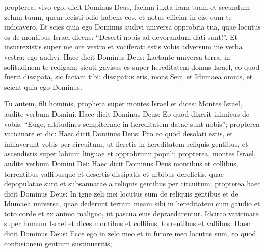 \begin{biblechapter}
\begin{biblechapter}
\begin{biblechapter}
\begin{biblechapter}
\begin{biblechapter}
\begin{biblechapter}
\begin{biblechapter}
\begin{biblechapter}
\begin{biblechapter}
\begin{biblechapter}
\begin{biblechapter}
\begin{biblechapter}
\begin{biblechapter}
\begin{biblechapter}
\begin{biblechapter}
\begin{biblechapter}
\begin{biblechapter}
\begin{biblechapter}
\begin{biblechapter}
\begin{biblechapter}
\begin{biblechapter}
\begin{biblechapter}
\begin{biblechapter}
\begin{biblechapter}
\begin{biblechapter}
\begin{biblechapter}
\begin{biblechapter}
\begin{biblechapter}
\begin{biblechapter}
\begin{biblechapter}
\begin{biblechapter}
\begin{biblechapter}
\begin{biblechapter}
\begin{biblechapter}
\begin{biblechapter}
\verse propterea, vivo ego, dicit Dominus Deus, faciam iuxta iram tuam et secundum zelum tuum, quem fecisti odio habens eos, et notus efficiar in eis, cum te iudicavero. 
\verse Et scies quia ego Dominus audivi universa opprobria tua, quae locutus es de montibus Israel dicens: “Deserti nobis ad devorandum dati sunt!”. 
\verse Et insurrexistis super me ore vestro et vociferati estis vobis adversum me verba vestra; ego audivi.
 \verse Haec dicit Dominus Deus: Laetante universa terra, in solitudinem te redigam; 
\verse sicuti gavisus es super hereditatem domus Israel, eo quod fuerit dissipata, sic faciam tibi: dissipatus eris, mons Seir, et Idumaea omnis, et scient quia ego Dominus.
 
\begin{biblechapter}
\verse Tu autem, fili hominis, propheta super montes Israel et dices: Montes Israel, audite verbum Domini. 
 \verse Haec dicit Dominus Deus: Eo quod dixerit inimicus de vobis: “Euge, altitudines sempiternae in hereditatem datae sunt nobis”; 
 \verse propterea vaticinare et dic: Haec dicit Dominus Deus: Pro eo quod desolati estis, et inhiaverunt vobis per circuitum, ut fieretis in hereditatem reliquis gentibus, et ascendistis super labium linguae et opprobrium populi; 
 \verse propterea, montes Israel, audite verbum Domini Dei: Haec dicit Dominus Deus montibus et collibus, torrentibus vallibusque et desertis dissipatis et urbibus derelictis, quae depopulatae sunt et subsannatae a reliquis gentibus per circuitum; 
\verse propterea haec dicit Dominus Deus: In igne zeli mei locutus sum de reliquis gentibus et de Idumaea universa, quae dederunt terram meam sibi in hereditatem cum gaudio et toto corde et ex animo maligno, ut pascua eius depraedarentur. 
\verse Idcirco vaticinare super humum Israel et dices montibus et collibus, torrentibus et vallibus: Haec dicit Dominus Deus: Ecce ego in zelo meo et in furore meo locutus sum, eo quod confusionem gentium sustinueritis; 

\end{biblechapter}
\end{biblechapter}
\end{biblechapter}
\end{biblechapter}
\end{biblechapter}
\end{biblechapter}
\end{biblechapter}
\end{biblechapter}
\end{biblechapter}
\end{biblechapter}
\end{biblechapter}
\end{biblechapter}
\end{biblechapter}
\end{biblechapter}
\end{biblechapter}
\end{biblechapter}
\end{biblechapter}
\end{biblechapter}
\end{biblechapter}
\end{biblechapter}
\end{biblechapter}
\end{biblechapter}
\end{biblechapter}
\end{biblechapter}
\end{biblechapter}
\end{biblechapter}
\end{biblechapter}
\end{biblechapter}
\end{biblechapter}
\end{biblechapter}
\end{biblechapter}
\end{biblechapter}
\end{biblechapter}
\end{biblechapter}
\end{biblechapter}
\end{biblechapter}
